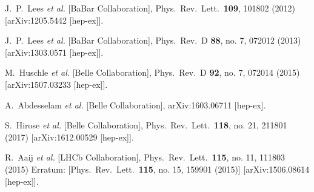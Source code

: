 \documentclass[prd,preprint,superscriptaddress,amsmath,amssymb]{revtex4}
\begin{document}
\begin{thebibliography}{100}
  J.~P.~Lees {\it et al.} [BaBar Collaboration],
  Phys.\ Rev.\ Lett.\  {\bf 109}, 101802 (2012)
  [arXiv:1205.5442 [hep-ex]].
  
  J.~P.~Lees {\it et al.} [BaBar Collaboration],
  Phys.\ Rev.\ D {\bf 88}, no. 7, 072012 (2013)
  [arXiv:1303.0571 [hep-ex]].



   
  M.~Huschle {\it et al.} [Belle Collaboration],
  Phys.\ Rev.\ D {\bf 92}, no. 7, 072014 (2015)
  [arXiv:1507.03233 [hep-ex]].
  
  A.~Abdesselam {\it et al.} [Belle Collaboration],
  arXiv:1603.06711 [hep-ex].
  
  S.~Hirose {\it et al.} [Belle Collaboration],
  Phys.\ Rev.\ Lett.\  {\bf 118}, no. 21, 211801 (2017)
  [arXiv:1612.00529 [hep-ex]].

  R.~Aaij {\it et al.} [LHCb Collaboration],
  Phys.\ Rev.\ Lett.\  {\bf 115}, no. 11, 111803 (2015)
  Erratum: [Phys.\ Rev.\ Lett.\  {\bf 115}, no. 15, 159901 (2015)]
  [arXiv:1506.08614 [hep-ex]].
  

\end{thebibliography}
\end{document}
